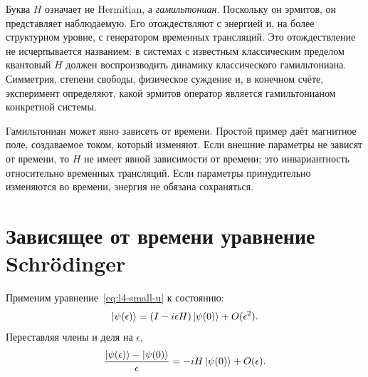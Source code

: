 Буква \(H\) означает не Hermitian, а \emph{гамильтониан}. Поскольку он эрмитов, он представляет наблюдаемую. Его отождествляют с энергией и, на более структурном уровне, с генератором временных трансляций. Это отождествление не исчерпывается названием: в системах с известным классическим пределом квантовый \(H\) должен воспроизводить динамику классического гамильтониана. Симметрия, степени свободы, физическое суждение и, в конечном счёте, эксперимент определяют, какой эрмитов оператор является гамильтонианом конкретной системы.

\begin{classroomqa}
\end{classroomqa}

Гамильтониан может явно зависеть от времени. Простой пример даёт магнитное поле, создаваемое током, который изменяют. Если внешние параметры не зависят от времени, то \(H\) не имеет явной зависимости от времени; это инвариантность относительно временных трансляций. Если параметры принудительно изменяются во времени, энергия не обязана сохраняться.

\begin{classroomqa}
\end{classroomqa}

\section{Зависящее от времени уравнение Schr\"odinger}

Применим уравнение~\eqref{eq:l4-small-u} к состоянию:
\begin{equation}
\left\lvert\psi(\epsilon)\right\rangle=(I-i\epsilon H)\left\lvert\psi(0)\right\rangle+O(\epsilon^2).
\end{equation}
Переставляя члены и деля на \(\epsilon\),
\begin{equation}
\frac{\left\lvert\psi(\epsilon)\right\rangle-\left\lvert\psi(0)\right\rangle}{\epsilon}
=-iH\left\lvert\psi(0)\right\rangle+O(\epsilon).
\label{eq:l4-difference-quotient}
\end{equation}

